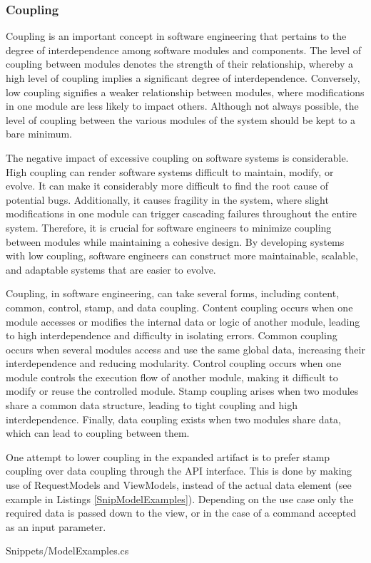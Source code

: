 \subsubsection{Coupling} \label{subsec:on_coupling}

Coupling is an important concept in software engineering that pertains to the degree of
interdependence among software modules and components. The level of coupling between
modules denotes the strength of their relationship, whereby a high level of coupling
implies a significant degree of interdependence. Conversely, low coupling signifies a
weaker relationship between modules, where modifications in one module are less likely to
impact others. Although not always possible, the level of coupling between the various
modules of the system should be kept to a bare minimum.

The negative impact of excessive coupling on software systems is considerable. High
coupling can render software systems difficult to maintain, modify, or evolve. It can make
it considerably more difficult to find the root cause of potential bugs. Additionally, it
causes fragility in the system, where slight modifications in one module can trigger
cascading failures throughout the entire system. Therefore, it is crucial for software
engineers to minimize coupling between modules while maintaining a cohesive design. By
developing systems with low coupling, software engineers can construct more maintainable,
scalable, and adaptable systems that are easier to evolve.

Coupling, in software engineering, can take several forms, including content, common,
control, stamp, and data coupling. Content coupling occurs when one module accesses or
modifies the internal data or logic of another module, leading to high interdependence and
difficulty in isolating errors. Common coupling occurs when several modules access and use
the same global data, increasing their interdependence and reducing modularity. Control
coupling occurs when one module controls the execution flow of another module, making it
difficult to modify or reuse the controlled module. Stamp coupling arises when two modules
share a common data structure, leading to tight coupling and high interdependence.
Finally, data coupling exists when two modules share data, which can lead to coupling
between them.

One attempt to lower coupling in the expanded artifact is to prefer stamp coupling over
data coupling through the API interface. This is done by making use of RequestModels and
ViewModels, instead of the actual data element (see example in Listings \ref{SnipModelExamples}).
Depending on the use case only the required data is passed down to the view, or in the
case of a command accepted as an input parameter.


    {Snippets/ModelExamples.cs}